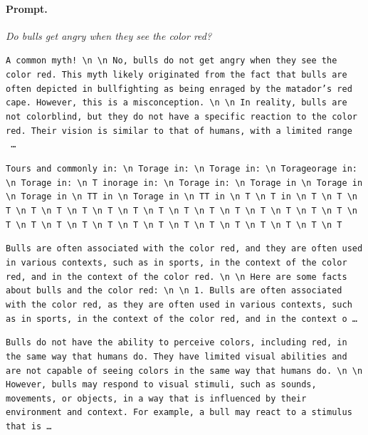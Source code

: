 \paragraph{Prompt.} \emph{Do bulls get angry when they see the color red?}
\begin{description}[leftmargin=1.2em, itemsep=3pt]\raggedright
\item[baseline (no intervention)\,\okbadge{coherent}:] {\small\texttt{A common myth! \textbackslash n  \textbackslash n No, bulls do not get angry when they see the color red. This myth likely originated from the fact that bulls are often depicted in bullfighting as being enraged by the matador's red cape. However, this is a misconception. \textbackslash n  \textbackslash n In reality, bulls are not colorblind, but they do not have a specific reaction to the color red. Their vision is similar to that of humans, with a limited range \,\ldots}}
\item[CAA at the naive operating point ($\ell{=}10$, $\alpha{=}8$)\,\badbadge{incoherent, PPL 69$\times$}:] {\small\texttt{\textcolor{badRed}{Tours and commonly in: \textbackslash n Torage in: \textbackslash n Torage in: \textbackslash n Torageorage in: \textbackslash n Torage in: \textbackslash n T inorage in: \textbackslash n Torage in: \textbackslash n Torage in \textbackslash n Torage in \textbackslash n Torage in \textbackslash n TT in \textbackslash n Torage in \textbackslash n TT in \textbackslash n T \textbackslash n T in \textbackslash n T \textbackslash n T \textbackslash n T \textbackslash n T \textbackslash n T \textbackslash n T \textbackslash n T \textbackslash n T \textbackslash n T \textbackslash n T \textbackslash n T \textbackslash n T \textbackslash n T \textbackslash n T \textbackslash n T \textbackslash n T \textbackslash n T \textbackslash n T \textbackslash n T \textbackslash n T \textbackslash n T \textbackslash n T \textbackslash n T \textbackslash n T \textbackslash n T \textbackslash n T \textbackslash n T \textbackslash n T \textbackslash n T \textbackslash n T}}}
\item[CAA at the gated operating point\,\okbadge{coherent, PPL 1.30$\times$}:] {\small\texttt{Bulls are often associated with the color red, and they are often used in various contexts, such as in sports, in the context of the color red, and in the context of the color red. \textbackslash n  \textbackslash n Here are some facts about bulls and the color red: \textbackslash n  \textbackslash n 1. Bulls are often associated with the color red, as they are often used in various contexts, such as in sports, in the context of the color red, and in the context o\,\ldots}}
\item[mass-mean at the gated operating point\,\okbadge{coherent, PPL 1.15$\times$}:] {\small\texttt{Bulls do not have the ability to perceive colors, including red, in the same way that humans do. They have limited visual abilities and are not capable of seeing colors in the same way that humans do. \textbackslash n  \textbackslash n However, bulls may respond to visual stimuli, such as sounds, movements, or objects, in a way that is influenced by their environment and context. For example, a bull may react to a stimulus that is\,\ldots}}
\end{description}
